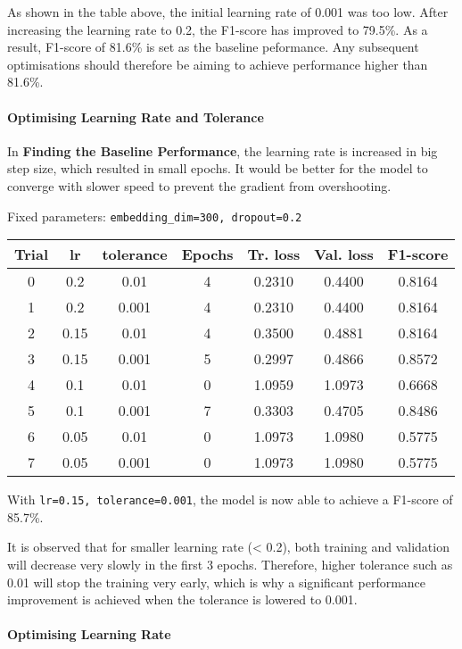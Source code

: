 \documentclass[11pt]{article}
\begin{document}
As shown in the table above, the initial learning rate of 0.001 was too
low. After increasing the learning rate to 0.2, the F1-score has
improved to 79.5\%. As a result, F1-score of 81.6\% is set as the
baseline peformance. Any subsequent optimisations should therefore be
aiming to achieve performance higher than 81.6\%.

\hypertarget{optimising-learning-rate-and-tolerance}{%
\paragraph{Optimising Learning Rate and
Tolerance}\label{optimising-learning-rate-and-tolerance}}

In \textbf{Finding the Baseline Performance}, the learning rate is
increased in big step size, which resulted in small epochs. It would be
better for the model to converge with slower speed to prevent the
gradient from overshooting.

Fixed parameters: \texttt{embedding\_dim=300,\ dropout=0.2}

\begin{longtable}[]{@{}ccccccc@{}}
\toprule
Trial & lr & tolerance & Epochs & Tr. loss & Val. loss &
F1-score\tabularnewline
\midrule
\endhead
0 & 0.2 & 0.01 & 4 & 0.2310 & 0.4400 & 0.8164\tabularnewline
1 & 0.2 & 0.001 & 4 & 0.2310 & 0.4400 & 0.8164\tabularnewline
2 & 0.15 & 0.01 & 4 & 0.3500 & 0.4881 & 0.8164\tabularnewline
3 & 0.15 & 0.001 & 5 & 0.2997 & 0.4866 & 0.8572\tabularnewline
4 & 0.1 & 0.01 & 0 & 1.0959 & 1.0973 & 0.6668\tabularnewline
5 & 0.1 & 0.001 & 7 & 0.3303 & 0.4705 & 0.8486\tabularnewline
6 & 0.05 & 0.01 & 0 & 1.0973 & 1.0980 & 0.5775\tabularnewline
7 & 0.05 & 0.001 & 0 & 1.0973 & 1.0980 & 0.5775\tabularnewline
\bottomrule
\end{longtable}

With \texttt{lr=0.15,\ tolerance=0.001}, the model is now able to
achieve a F1-score of 85.7\%.

It is observed that for smaller learning rate (\textless{} 0.2), both
training and validation will decrease very slowly in the first 3 epochs.
Therefore, higher tolerance such as 0.01 will stop the training very
early, which is why a significant performance improvement is achieved
when the tolerance is lowered to 0.001.

\hypertarget{optimising-learning-rate}{%
\paragraph{Optimising Learning Rate}\label{optimising-learning-rate}}
\end{document}
